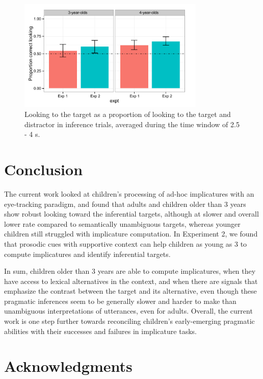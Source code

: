 \documentclass[10pt,letterpaper]{article}
\begin{document}
\begin{figure}
\begin{center} 
\includegraphics[width=3.5in]{figures/simpimp0pros-bar_inf.pdf}
\caption{\label{fig:0prosbar} Looking to the target as a proportion of looking to the target and distractor in inference trials, averaged during the time window of 2.5 - 4 s.}
\end{center} 
\end{figure}

\section{Conclusion}

The current work looked at children's processing of ad-hoc implicatures with an eye-tracking paradigm, and found that adults and children older than 3 years show robust looking toward the inferential targets, although at slower and overall lower rate compared to semantically unambiguous targets, whereas younger children still struggled with implicature computation. In Experiment 2, we found that prosodic cues with supportive context can help children as young as 3 to compute implicatures and identify inferential targets. 

In sum, children older than 3 years are able to compute implicatures, when they have access to lexical alternatives in the context, and when there are signals that emphasize the contrast between the target and its alternative, even though these pragmatic inferences seem to be generally slower and harder to make than unambiguous interpretations of utterances, even for adults. Overall, the current work is one step further towards reconciling children's early-emerging pragmatic abilities with their successes and failures in implicature tasks.

\section{Acknowledgments}
\end{document}
